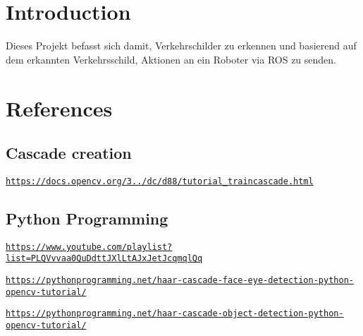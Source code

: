 \hypertarget{index_intro_sec}{}\section{Introduction}\label{index_intro_sec}
Dieses Projekt befasst sich damit, Verkehrschilder zu erkennen und basierend auf dem erkannten Verkehrsschild, Aktionen an ein Roboter via R\+OS zu senden.\hypertarget{index_references}{}\section{References}\label{index_references}
\hypertarget{index_cascade_creation}{}\subsection{Cascade creation}\label{index_cascade_creation}

\begin{DoxyItemize}
\item \href{https://docs.opencv.org/3.3.0/dc/d88/tutorial_traincascade.html}{\tt https\+://docs.\+opencv.\+org/3../dc/d88/tutorial\+\_\+traincascade.\+html}
\end{DoxyItemize}\hypertarget{index_python_programming}{}\subsection{Python Programming}\label{index_python_programming}

\begin{DoxyItemize}
\item \href{https://www.youtube.com/playlist?list=PLQVvvaa0QuDdttJXlLtAJxJetJcqmqlQq}{\tt https\+://www.\+youtube.\+com/playlist?list=\+P\+L\+Q\+Vvvaa0\+Qu\+Ddtt\+J\+Xl\+Lt\+A\+Jx\+Jet\+Jcqmql\+Qq}
\item \href{https://pythonprogramming.net/haar-cascade-face-eye-detection-python-opencv-tutorial/}{\tt https\+://pythonprogramming.\+net/haar-\/cascade-\/face-\/eye-\/detection-\/python-\/opencv-\/tutorial/}
\item \href{https://pythonprogramming.net/haar-cascade-object-detection-python-opencv-tutorial/}{\tt https\+://pythonprogramming.\+net/haar-\/cascade-\/object-\/detection-\/python-\/opencv-\/tutorial/} 
\end{DoxyItemize}